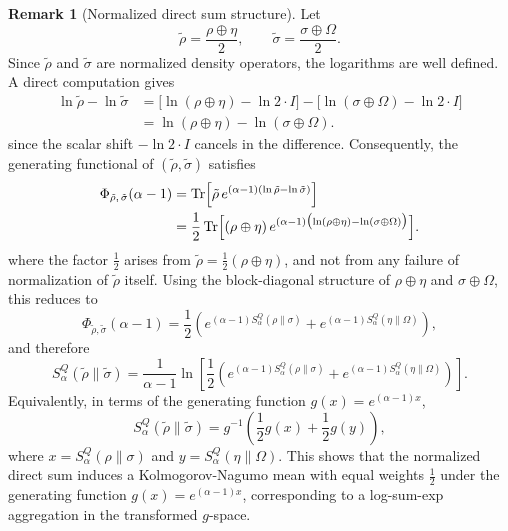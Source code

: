 \documentclass[a4paper, amsfonts, amssymb, amsmath, reprint, showkeys, nofootinbib, twoside, aps, pra]{revtex4-2}
\theoremstyle{definition}
\newtheorem{remark}{Remark}
\begin{document}
\begin{remark}[Normalized direct sum structure]
Let
\begin{equation}
    \tilde\rho=\frac{\rho\oplus\eta}{2}, \qquad
\tilde\sigma=\frac{\sigma\oplus\Omega}{2}.
\end{equation}
Since $\tilde\rho$ and $\tilde\sigma$ are normalized density 
operators, the logarithms are well defined. A direct computation 
gives
\begin{equation}
\begin{aligned}
\ln\tilde\rho - \ln\tilde\sigma
&= \bigl[ \ln(\rho\oplus\eta) - \ln 2 \cdot I \bigr] - \bigl[ \ln(\sigma\oplus\Omega) - \ln 2 \cdot I \bigr] \\
&= \ln(\rho\oplus\eta) - \ln(\sigma\oplus\Omega).
\end{aligned}
\end{equation}
since the scalar shift $-\ln 2\cdot I$ cancels in the difference.
Consequently, the generating functional of $(\tilde\rho,\tilde\sigma)$
satisfies
\begin{equation}
\begin{aligned}
\Phi_{\tilde\rho,\,\tilde\sigma}(\alpha-1)
&= \mathrm{Tr}\Bigl[ \tilde\rho\, e^{(\alpha-1)(\ln\tilde\rho-\ln\tilde\sigma)} \Bigr] \\
&= \frac{1}{2}\,\mathrm{Tr}\Bigl[ (\rho\oplus\eta)\, e^{(\alpha-1)\bigl(\ln(\rho\oplus\eta)-\ln(\sigma\oplus\Omega)\bigr)} \Bigr].
\end{aligned}
\end{equation}
where the factor $\tfrac{1}{2}$ arises from 
$\tilde\rho = \tfrac{1}{2}(\rho\oplus\eta)$, 
and not from any failure of normalization of $\tilde\rho$ itself.
Using the block-diagonal structure of $\rho\oplus\eta$ and 
$\sigma\oplus\Omega$, this reduces to
\begin{equation}
\Phi_{\tilde\rho,\tilde\sigma}(\alpha-1)
=
\frac{1}{2}
\left(
e^{(\alpha-1)S^Q_\alpha(\rho\|\sigma)}
+
e^{(\alpha-1)S^Q_\alpha(\eta\|\Omega)}
\right),
\end{equation}
and therefore
\begin{equation}
S^Q_\alpha(\tilde\rho\|\tilde\sigma)
=
\frac{1}{\alpha-1}
\ln\!\left[
\frac{1}{2}
\left(
e^{(\alpha-1)S^Q_\alpha(\rho\|\sigma)}
+
e^{(\alpha-1)S^Q_\alpha(\eta\|\Omega)}
\right)
\right].
\end{equation}
Equivalently, in terms of the generating function 
$g(x)=e^{(\alpha-1)x}$,
\begin{equation}
S^Q_\alpha(\tilde\rho\|\tilde\sigma)
=
g^{-1}\!\left(
\frac{1}{2}g(x)+\frac{1}{2}g(y)
\right),
\end{equation}
where $x=S^Q_\alpha(\rho\|\sigma)$ and 
$y=S^Q_\alpha(\eta\|\Omega)$.
This shows that the normalized direct sum induces a 
Kolmogorov-Nagumo mean with equal weights $\tfrac{1}{2}$ 
under the generating function $g(x)=e^{(\alpha-1)x}$, 
corresponding to a log-sum-exp aggregation in the transformed 
$g$-space.
\end{remark}
\end{document}
